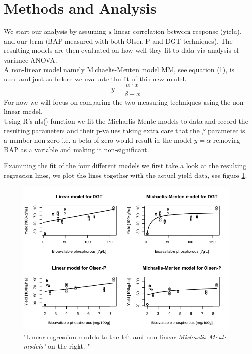 \documentclass{article}
\begin{document}
\section{Methods and Analysis}
We start our analysis by assuming a linear correlation between response (yield), and our term (BAP measured with both Olsen P and DGT techniques). The resulting models are then evaluated on how well they fit to data via analysis of variance ANOVA. \\ A non-linear model namely Michaelis-Menten model MM, see equation (1), is used and just as before we evaluate the fit of this new model.
\begin{equation}
y = \frac{\alpha \cdot x}{\beta + x}
\end{equation}
For now we will focus on comparing the two measuring techniques using the non-linear model. \\ Using R's nls() function we fit the Michaelis-Mente models to data and record the resulting parameters and their p-values taking extra care that the $\beta$ parameter is a number non-zero i.e. a beta of zero would result in the model $y = \alpha$ removing BAP as a variable and making it non-significant. 

Examining the fit of the four different models we first take a look at the resulting regression lines, we plot the lines together with the actual yield data, see figure \ref{fig:linearnonlinear}.
\begin{figure}[H]
	\includegraphics[width=\linewidth]{linearnonlinear.png}
	\caption{"Linear regression models to the left and non-linear \textit{Michaelis Mente models"} on the right. "}
	\label{fig:linearnonlinear}
\end{figure}
\end{document}
